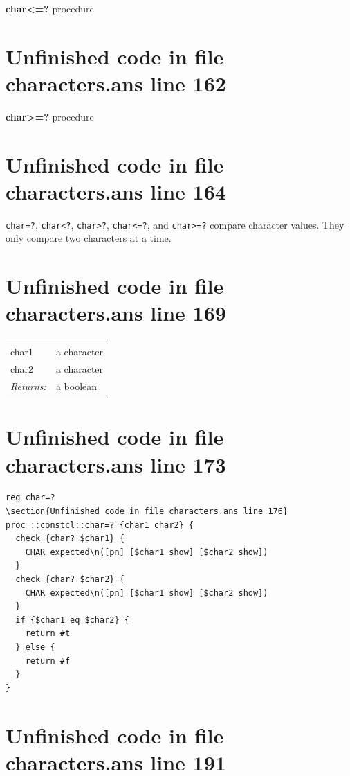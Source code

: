 \documentclass[twoside,9pt]{report}
\begin{document}
\noindent \textbf{char<=?} procedure

\section{Unfinished code in file characters.ans line 162}

\noindent \textbf{char>=?} procedure

\section{Unfinished code in file characters.ans line 164}


\texttt{char=?}, \texttt{char<?}, \texttt{char>?}, \texttt{char<=?}, and \texttt{char>=?} compare character values. They only compare two characters at a time.

\section{Unfinished code in file characters.ans line 169}
\noindent\begin{tabular}{ |p{1.9cm} p{8cm}| }
\hline
\rowcolor[HTML]{CCCCCC} \multicolumn{2}{|l|}{\bf char=?, char<?, char>?, char<=?, char>=? (public)} \\
char1 & a character \\
char2 & a character \\
\textit{Returns:} & a boolean \\
\hline
\end{tabular}
\section{Unfinished code in file characters.ans line 173}
\begin{lstlisting}
reg char=?
\section{Unfinished code in file characters.ans line 176}
proc ::constcl::char=? {char1 char2} {
  check {char? $char1} {
    CHAR expected\n([pn] [$char1 show] [$char2 show])
  }
  check {char? $char2} {
    CHAR expected\n([pn] [$char1 show] [$char2 show])
  }
  if {$char1 eq $char2} {
    return #t
  } else {
    return #f
  }
}
\end{lstlisting}
\section{Unfinished code in file characters.ans line 191}
\end{document}
